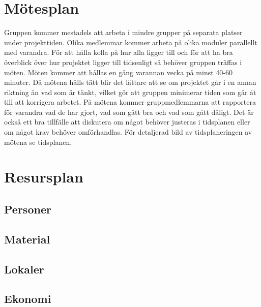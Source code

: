 \documentclass[projektplan/plan.tex]{subfiles}
\begin{document}
\section{Mötesplan}
Gruppen kommer mestadels att arbeta i mindre grupper på separata platser under projekttiden. Olika medlemmar kommer arbeta på olika moduler parallellt med varandra. För att hålla kolla på hur alla ligger till och för att ha bra överblick över hur projektet ligger till tidsenligt så behöver gruppen träffas i möten. Möten kommer att hållas en gång varannan vecka på minst 40-60 minuter. Då mötena hålls tätt blir det lättare att se om projektet går i en annan riktning än vad som är tänkt, vilket gör att gruppen minimerar tiden som går åt till att korrigera arbetet. På mötena kommer gruppmedlemmarna att rapportera för varandra vad de har gjort, vad som gått bra och vad som gått dåligt. Det är också ett bra tillfälle att diskutera om något behöver justeras i tidsplanen eller om något krav behöver omförhandlas. För detaljerad bild av tidsplaneringen av mötena se tidsplanen.
\section{Resursplan}
\subsection{Personer}
\subsection{Material}
\subsection{Lokaler}
\subsection{Ekonomi}
\end{document}
